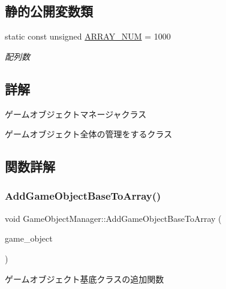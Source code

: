 \subsection*{静的公開変数類}
\begin{DoxyCompactItemize}
\item 
static const unsigned \mbox{\hyperlink{class_game_object_manager_a591934d64d750c10c03c908371470681}{A\+R\+R\+A\+Y\+\_\+\+N\+UM}} = 1000
\begin{DoxyCompactList}\small\item\em 配列数 \end{DoxyCompactList}\end{DoxyCompactItemize}


\subsection{詳解}
ゲームオブジェクトマネージャクラス 

ゲームオブジェクト全体の管理をするクラス 

\subsection{関数詳解}
\mbox{\label{class_game_object_manager_ab42e8ca2c7e586d05d513e8a868a86ef}} 
\subsubsection{\texorpdfstring{Add\+Game\+Object\+Base\+To\+Array()}{AddGameObjectBaseToArray()}}
{\footnotesize\ttfamily void Game\+Object\+Manager\+::\+Add\+Game\+Object\+Base\+To\+Array (\begin{DoxyParamCaption}\item[{\mbox{\hyperlink{class_game_object_base}{Game\+Object\+Base}} $\ast$}]{game\+\_\+object }\end{DoxyParamCaption})\hspace{0.3cm}{\ttfamily [static]}}



ゲームオブジェクト基底クラスの追加関数 

\mbox{\label{class_game_object_manager_a38f980aec0970f45eb9bc55db8ac01a3}} 
